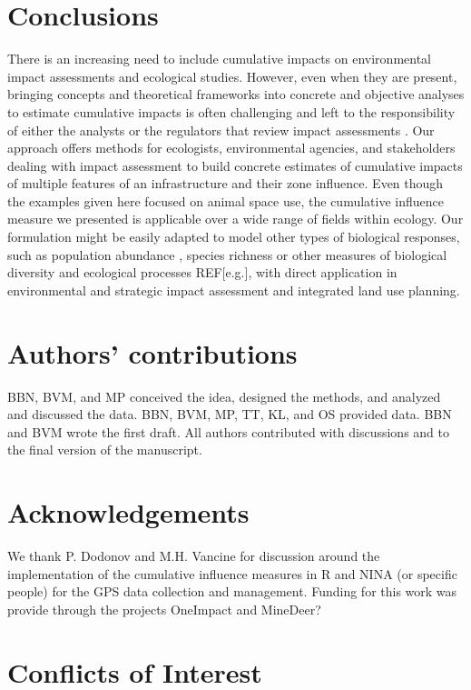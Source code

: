 \documentclass[titlepage]{article}
\begin{document}
\section{Conclusions}

There is an increasing need to include cumulative impacts on environmental impact assessments and ecological studies. However, even when they are present, bringing concepts and theoretical frameworks into concrete and objective analyses to estimate cumulative impacts is often challenging and left to the responsibility of either the analysts or the regulators that review impact assessments \citep{johnson_regulating_2011}. Our approach offers methods for ecologists, environmental agencies, and stakeholders dealing with impact assessment to build concrete estimates of cumulative impacts of multiple features of an infrastructure and their zone influence. 
Even though the examples given here focused on animal space use, the cumulative influence measure we presented is applicable over a wide range
of fields within ecology. Our formulation might be easily adapted to model other types of biological responses, such as population abundance \citep[e.g.][]{benitez-lopez_impacts_2010},
species richness \citep[e.g.][]{ficetola_ecological_2009} or other measures of biological diversity and ecological processes REF[e.g.], with direct application in environmental and strategic impact assessment and integrated land use planning.
      
\section*{Authors’ contributions}

BBN, BVM, and MP conceived the idea, designed the methods, and analyzed and discussed the data. BBN, BVM, MP, TT, KL, and OS provided data. BBN and BVM wrote the first draft. All authors contributed with discussions and to the final version of the manuscript.

\section*{Acknowledgements}

We thank P. Dodonov and M.H. Vancine for discussion around the implementation of the cumulative influence measures in R and NINA (or specific people) for the GPS data collection and management. Funding for this work was provide through the projects OneImpact and MineDeer?

\section*{Conflicts of Interest}
\end{document}
